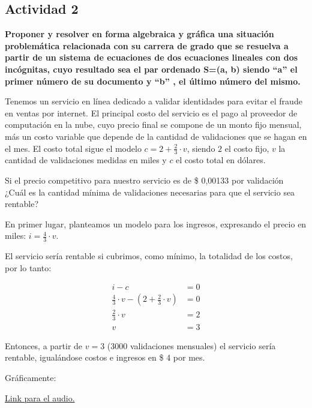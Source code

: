 \subsection*{Actividad 2}
\textbf{Proponer y resolver en forma algebraica y gráfica una situación
problemática relacionada con su carrera de grado que se resuelva a
partir de un sistema de ecuaciones de dos ecuaciones lineales con
dos incógnitas, cuyo resultado sea el par ordenado S=(a, b) siendo
“a” el primer número de su documento y “b” , el último número del
mismo.}

Tenemos un servicio en línea dedicado a validar identidades para evitar el fraude en ventas por internet. El principal costo del servicio es el pago al proveedor de computación en la nube, cuyo precio final se compone de un monto fijo mensual, más un costo variable que depende de la cantidad de validaciones que se hagan en el mes. El costo total sigue el modelo $c = 2 + \frac{2}{3} \cdot v$, siendo $2$ el costo fijo, $v$ la cantidad de validaciones medidas en miles y $c$ el costo total en dólares. 

Si el precio competitivo para nuestro servicio es de \$ 0,00133 por validación ¿Cuál es la cantidad mínima de validaciones necesarias para que el servicio sea rentable?

En primer lugar, planteamos un modelo para los ingresos, expresando el precio en miles: $i = \frac{4}{3} \cdot v$.

El servicio sería rentable si cubrimos, como mínimo, la totalidad de los costos, por lo tanto:

\begin{align*}
	i - c &= 0\\
    \frac{4}{3} \cdot v - \left(2 + \frac{2}{3} \cdot v \right) &= 0\\
    \frac{2}{3} \cdot v &= 2\\
    v &= 3
\end{align*}

Entonces, a partir de $v = 3$ (3000 validaciones mensuales) el servicio sería rentable, igualándose costos e ingresos en \$ 4 por mes.

Gráficamente:

\begin{center}
\end{center}

\href{https://drive.google.com/file/d/1DXpY7xukQlkF4CswWKmvItGMWZuxZohS/view?usp=sharing}{Link para el audio.}
